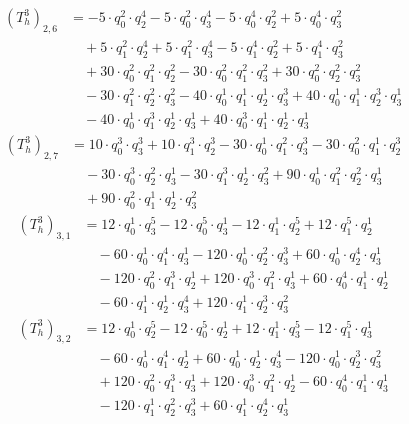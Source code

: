 \begin{align*}(T_{h}^3)_{2,6}&=-5\cdot q_0^{2}\cdot q_2^{4}-5\cdot q_0^{2}\cdot q_3^{4}-5\cdot q_0^{4}\cdot q_2^{2}+5\cdot q_0^{4}\cdot q_3^{2}\\
&\quad +5\cdot q_1^{2}\cdot q_2^{4}+5\cdot q_1^{2}\cdot q_3^{4}-5\cdot q_1^{4}\cdot q_2^{2}+5\cdot q_1^{4}\cdot q_3^{2}\\
&\quad +30\cdot q_0^{2}\cdot q_1^{2}\cdot q_2^{2}-30\cdot q_0^{2}\cdot q_1^{2}\cdot q_3^{2}+30\cdot q_0^{2}\cdot q_2^{2}\cdot q_3^{2}\\
&\quad -30\cdot q_1^{2}\cdot q_2^{2}\cdot q_3^{2}-40\cdot q_0^{1}\cdot q_1^{1}\cdot q_2^{1}\cdot q_3^{3}+40\cdot q_0^{1}\cdot q_1^{1}\cdot q_2^{3}\cdot q_3^{1}\\
&\quad -40\cdot q_0^{1}\cdot q_1^{3}\cdot q_2^{1}\cdot q_3^{1}+40\cdot q_0^{3}\cdot q_1^{1}\cdot q_2^{1}\cdot q_3^{1}\end{align*}
\begin{align*}(T_{h}^3)_{2,7}&=10\cdot q_0^{3}\cdot q_3^{3}+10\cdot q_1^{3}\cdot q_2^{3}-30\cdot q_0^{1}\cdot q_1^{2}\cdot q_3^{3}-30\cdot q_0^{2}\cdot q_1^{1}\cdot q_2^{3}\\
&\quad -30\cdot q_0^{3}\cdot q_2^{2}\cdot q_3^{1}-30\cdot q_1^{3}\cdot q_2^{1}\cdot q_3^{2}+90\cdot q_0^{1}\cdot q_1^{2}\cdot q_2^{2}\cdot q_3^{1}\\
&\quad +90\cdot q_0^{2}\cdot q_1^{1}\cdot q_2^{1}\cdot q_3^{2}\end{align*}
\begin{align*}(T_{h}^3)_{3,1}&=12\cdot q_0^{1}\cdot q_3^{5}-12\cdot q_0^{5}\cdot q_3^{1}-12\cdot q_1^{1}\cdot q_2^{5}+12\cdot q_1^{5}\cdot q_2^{1}\\
&\quad -60\cdot q_0^{1}\cdot q_1^{4}\cdot q_3^{1}-120\cdot q_0^{1}\cdot q_2^{2}\cdot q_3^{3}+60\cdot q_0^{1}\cdot q_2^{4}\cdot q_3^{1}\\
&\quad -120\cdot q_0^{2}\cdot q_1^{3}\cdot q_2^{1}+120\cdot q_0^{3}\cdot q_1^{2}\cdot q_3^{1}+60\cdot q_0^{4}\cdot q_1^{1}\cdot q_2^{1}\\
&\quad -60\cdot q_1^{1}\cdot q_2^{1}\cdot q_3^{4}+120\cdot q_1^{1}\cdot q_2^{3}\cdot q_3^{2}\end{align*}
\begin{align*}(T_{h}^3)_{3,2}&=12\cdot q_0^{1}\cdot q_2^{5}-12\cdot q_0^{5}\cdot q_2^{1}+12\cdot q_1^{1}\cdot q_3^{5}-12\cdot q_1^{5}\cdot q_3^{1}\\
&\quad -60\cdot q_0^{1}\cdot q_1^{4}\cdot q_2^{1}+60\cdot q_0^{1}\cdot q_2^{1}\cdot q_3^{4}-120\cdot q_0^{1}\cdot q_2^{3}\cdot q_3^{2}\\
&\quad +120\cdot q_0^{2}\cdot q_1^{3}\cdot q_3^{1}+120\cdot q_0^{3}\cdot q_1^{2}\cdot q_2^{1}-60\cdot q_0^{4}\cdot q_1^{1}\cdot q_3^{1}\\
&\quad -120\cdot q_1^{1}\cdot q_2^{2}\cdot q_3^{3}+60\cdot q_1^{1}\cdot q_2^{4}\cdot q_3^{1}\end{align*}
